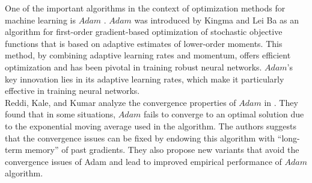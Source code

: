 \documentclass{article}
\begin{document}
One of the important algorithms in the context of optimization methods for machine learning is $Adam$ \cite{adam}. $Adam$ was introduced by Kingma and Lei Ba as an algorithm for first-order gradient-based optimization of
stochastic objective functions that is based on adaptive estimates of lower-order moments. This method, by combining adaptive learning rates and momentum, offers efficient optimization and has been pivotal in training robust neural networks. $Adam$'s key innovation lies in its adaptive learning rates, which make it particularly effective in training neural networks.\\ Reddi, Kale, and Kumar analyze the convergence properties of $Adam$ in \cite{convad}. They found that in some situations, $Adam$ fails to converge  to an optimal solution due to the exponential moving average used
in the algorithm. The authors suggests that the convergence issues can be fixed by endowing this algorithm with “long-term memory” of past gradients. They also propose new variants that avoid the convergence issues of Adam and lead to improved empirical performance of $Adam$ algorithm.



\nocite{*}
 
\end{document}
